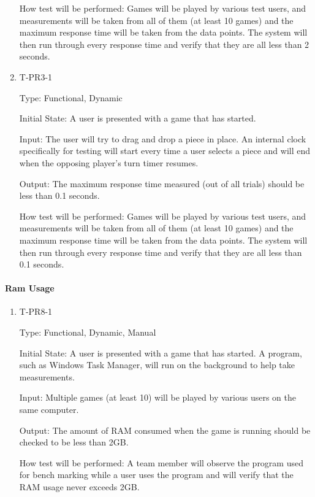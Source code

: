 \documentclass[12pt, titlepage]{article}
\begin{document}
\begin{enumerate}
                How test will be performed: Games will be played by various test users, and measurements will be taken from all of them (at least 10 games) and the maximum response time will be taken from the data points. The system will then run through every response time and verify that they are all less than 2 seconds.
            
            \item{T-PR3-1\\}
            
                Type: Functional, Dynamic
                		
                Initial State: A user is presented with a game that has started.
        
                Input: The user will try to drag and drop a piece in place. An
                internal clock specifically for testing will start every time a user selects a piece and will end when the opposing player's turn timer resumes.
                					
                Output: The maximum response time measured (out of all trials) should be less than 0.1 seconds.
                					
                How test will be performed: Games will be played by various test users, and measurements will be taken from all of them (at least 10 games) and the maximum response time will be taken from the data points. The system will then run through every response time and verify that they are all less than 0.1 seconds.
                
        \end{enumerate}
        
    \paragraph{Ram Usage}
        
        \begin{enumerate}
            \item{T-PR8-1\\}
            
                Type: Functional, Dynamic, Manual
                					
                Initial State: A user is presented with a game that has started. A program, such as Windows Task Manager, will run on the background to help take measurements.
            					
                Input: Multiple games (at least 10) will be played by various users on the same computer.
                					
                Output: The amount of RAM consumed when the game is running should be checked to be less than 2GB.
                					
                How test will be performed: A team member will observe the program used for bench marking while a user uses the program and will verify that the RAM usage never exceeds 2GB.
            
        \end{enumerate}
\end{document}
